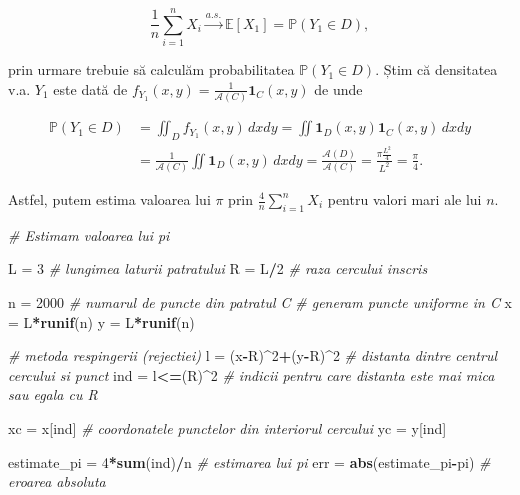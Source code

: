 \documentclass[]{article}
\newenvironment{Shaded}{\begin{snugshade}}{\end{snugshade}}
\newcommand{\CommentTok}[1]{\textcolor[rgb]{0.56,0.35,0.01}{\textit{#1}}}
\newcommand{\DecValTok}[1]{\textcolor[rgb]{0.00,0.00,0.81}{#1}}
\newcommand{\KeywordTok}[1]{\textcolor[rgb]{0.13,0.29,0.53}{\textbf{#1}}}
\newcommand{\NormalTok}[1]{#1}
\newcommand{\OperatorTok}[1]{\textcolor[rgb]{0.81,0.36,0.00}{\textbf{#1}}}
\newcommand{\StringTok}[1]{\textcolor[rgb]{0.31,0.60,0.02}{#1}}
\begin{document}
\[
  \displaystyle\frac{1}{n}\sum_{i=1}^{n}X_{i} \overset{a.s.}{\to} \mathbb{E}[X_1] = \mathbb{P}(Y_1\in D),
\]

prin urmare trebuie să calculăm probabilitatea \(\mathbb{P}(Y_1\in D)\).
Știm că densitatea v.a. \(Y_1\) este dată de
\(f_{Y_1}(x,y)=\frac{1}{\mathcal{A}(C)}\mathbf{1}_{C}(x,y)\) de unde

\[
\begin{aligned}
  \mathbb{P}(Y_1\in D) &= \iint_{D}f_{Y_1}(x,y)\,dxdy = \iint \mathbf{1}_{D}(x,y)\mathbf{1}_{C}(x,y)\,dxdy\\
                       &= \frac{1}{\mathcal{A}(C)}\iint \mathbf{1}_{D}(x,y)\,dxdy = \frac{\mathcal{A}(D)}{\mathcal{A}(C)} = \frac{\pi \frac{L^2}{4}}{L^2} = \frac{\pi}{4}.
\end{aligned}
\]

Astfel, putem estima valoarea lui \(\pi\) prin
\(\displaystyle\frac{4}{n}\sum_{i=1}^{n}X_{i}\) pentru valori mari ale
lui \(n\).

\begin{Shaded}
\begin{Highlighting}[]
\CommentTok{# Estimam valoarea lui pi}

\NormalTok{L =}\StringTok{ }\DecValTok{3} \CommentTok{# lungimea laturii patratului }
\NormalTok{R =}\StringTok{ }\NormalTok{L}\OperatorTok{/}\DecValTok{2} \CommentTok{# raza cercului inscris}

\NormalTok{n =}\StringTok{ }\DecValTok{2000} \CommentTok{# numarul de puncte din patratul C}
\CommentTok{# generam puncte uniforme in C}
\NormalTok{x =}\StringTok{ }\NormalTok{L}\OperatorTok{*}\KeywordTok{runif}\NormalTok{(n)}
\NormalTok{y =}\StringTok{ }\NormalTok{L}\OperatorTok{*}\KeywordTok{runif}\NormalTok{(n)}

\CommentTok{# metoda respingerii (rejectiei)}
\NormalTok{l =}\StringTok{ }\NormalTok{(x}\OperatorTok{-}\NormalTok{R)}\OperatorTok{^}\DecValTok{2}\OperatorTok{+}\NormalTok{(y}\OperatorTok{-}\NormalTok{R)}\OperatorTok{^}\DecValTok{2} \CommentTok{# distanta dintre centrul cercului si punct}
\NormalTok{ind =}\StringTok{ }\NormalTok{l}\OperatorTok{<=}\NormalTok{(R)}\OperatorTok{^}\DecValTok{2} \CommentTok{# indicii pentru care distanta este mai mica sau egala cu R}

\NormalTok{xc =}\StringTok{ }\NormalTok{x[ind] }\CommentTok{# coordonatele punctelor din interiorul cercului  }
\NormalTok{yc =}\StringTok{ }\NormalTok{y[ind] }

\NormalTok{estimate_pi =}\StringTok{ }\DecValTok{4}\OperatorTok{*}\KeywordTok{sum}\NormalTok{(ind)}\OperatorTok{/}\NormalTok{n }\CommentTok{# estimarea lui pi}
\NormalTok{err =}\StringTok{ }\KeywordTok{abs}\NormalTok{(estimate_pi}\OperatorTok{-}\NormalTok{pi) }\CommentTok{# eroarea absoluta}
\end{Highlighting}
\end{Shaded}
\end{document}
